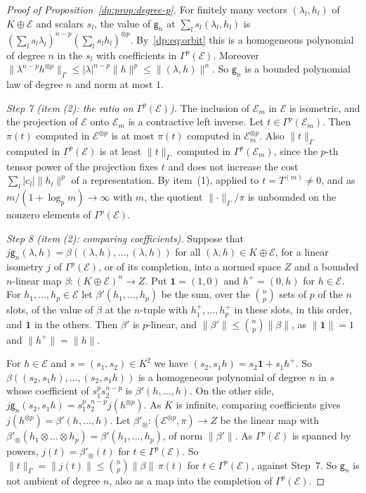\documentclass[11pt]{amsart}
\theoremstyle{definition}
\theoremstyle{remark}
\numberwithin{equation}{section}
\newcommand{\abs}[1]{\lvert #1\rvert}
\newcommand{\norm}[1]{\lVert #1\rVert}
\theoremstyle{plain}
\theoremstyle{definition}
\theoremstyle{plain}
\begin{document}
\begin{proof}[Proof of Proposition~\ref{dp:prop:degree-p}]
For finitely many vectors $(\lambda_l,h_l)$ of $K\oplus\mathcal E$ and scalars $s_l$, the value of $\mathsf g_n$ at $\sum_ls_l(\lambda_l,h_l)$ is $(\sum_ls_l\lambda_l)^{n-p}(\sum_ls_lh_l)^{\otimes p}$. By~\eqref{dp:eq:orbit} this is a homogeneous polynomial of degree $n$ in the $s_l$ with coefficients in $\Gamma^p(\mathcal E)$. Moreover $\norm{\lambda^{n-p}h^{\otimes p}}_\Gamma\le\abs\lambda^{n-p}\norm h^p\le\norm{(\lambda,h)}^n$. So $\mathsf g_n$ is a bounded polynomial law of degree $n$ and norm at most $1$.

\emph{Step 7 (item (2): the ratio on $\Gamma^p(\mathcal E)$).} The inclusion of $\mathcal E_m$ in $\mathcal E$ is isometric, and the projection of $\mathcal E$ onto $\mathcal E_m$ is a contractive left inverse. Let $t\in\Gamma^p(\mathcal E_m)$. Then $\pi(t)$ computed in $\mathcal E^{\otimes p}$ is at most $\pi(t)$ computed in $\mathcal E_m^{\otimes p}$. Also $\norm t_\Gamma$ computed in $\Gamma^p(\mathcal E)$ is at least $\norm t_\Gamma$ computed in $\Gamma^p(\mathcal E_m)$, since the $p$-th tensor power of the projection fixes $t$ and does not increase the cost $\sum_l\abs{c_l}\norm{h_l}^p$ of a representation. By item~(1), applied to $t=T^{(m)}\ne0$, and as $m/(1+\log_pm)\to\infty$ with $m$, the quotient $\norm\cdot_\Gamma/\pi$ is unbounded on the nonzero elements of $\Gamma^p(\mathcal E)$.

\emph{Step 8 (item (2): comparing coefficients).} Suppose that $j\mathsf g_n(\lambda,h)=\beta((\lambda,h),\dots,(\lambda,h))$ for all $(\lambda,h)\in K\oplus\mathcal E$, for a linear isometry $j$ of $\Gamma^p(\mathcal E)$, or of its completion, into a normed space $Z$ and a bounded $n$\nobreakdash-linear map $\beta\colon(K\oplus\mathcal E)^n\to Z$. Put $\mathbf 1=(1,0)$ and $h^+=(0,h)$ for $h\in\mathcal E$. For $h_1,\dots,h_p\in\mathcal E$ let $\beta'(h_1,\dots,h_p)$ be the sum, over the $\binom np$ sets of $p$ of the $n$ slots, of the value of $\beta$ at the $n$-tuple with $h_1^+,\dots,h_p^+$ in these slots, in this order, and $\mathbf 1$ in the others. Then $\beta'$ is $p$\nobreakdash-linear, and $\norm{\beta'}\le\binom np\norm\beta$, as $\norm{\mathbf 1}=1$ and $\norm{h^+}=\norm h$.

For $h\in\mathcal E$ and $s=(s_1,s_2)\in K^2$ we have $(s_2,s_1h)=s_2\mathbf 1+s_1h^+$. So $\beta((s_2,s_1h),\dots,(s_2,s_1h))$ is a homogeneous polynomial of degree $n$ in $s$ whose coefficient of $s_1^ps_2^{n-p}$ is $\beta'(h,\dots,h)$. On the other side, $j\mathsf g_n(s_2,s_1h)=s_1^ps_2^{n-p}j(h^{\otimes p})$. As $K$ is infinite, comparing coefficients gives $j(h^{\otimes p})=\beta'(h,\dots,h)$. Let $\beta'_\otimes\colon(\mathcal E^{\otimes p},\pi)\to Z$ be the linear map with $\beta'_\otimes(h_1\otimes\dots\otimes h_p)=\beta'(h_1,\dots,h_p)$, of norm $\norm{\beta'}$. As $\Gamma^p(\mathcal E)$ is spanned by powers, $j(t)=\beta'_\otimes(t)$ for $t\in\Gamma^p(\mathcal E)$. So $\norm t_\Gamma=\norm{j(t)}\le\binom np\norm\beta\,\pi(t)$ for $t\in\Gamma^p(\mathcal E)$, against Step~7. So $\mathsf g_n$ is not ambient of degree $n$, also as a map into the completion of $\Gamma^p(\mathcal E)$.
\end{proof}
\end{document}
